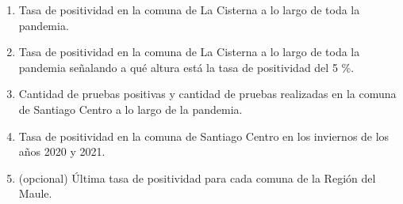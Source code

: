 \documentclass{article}
\begin{document}
\begin{enumerate}
    \item Tasa de positividad en la comuna de La Cisterna a lo largo de toda la pandemia.
    \item Tasa de positividad en la comuna de La Cisterna a lo largo de toda la pandemia señalando a qué altura está la tasa de positividad del 5 \%.
    \item Cantidad de pruebas positivas y cantidad de pruebas realizadas en la comuna de Santiago Centro a lo largo de la pandemia.
    \item Tasa de positividad en la comuna de Santiago Centro en los inviernos de los años 2020 y 2021.
    \item (opcional) Última tasa de positividad para cada comuna de la Región del Maule.
\end{enumerate}
\end{document}
